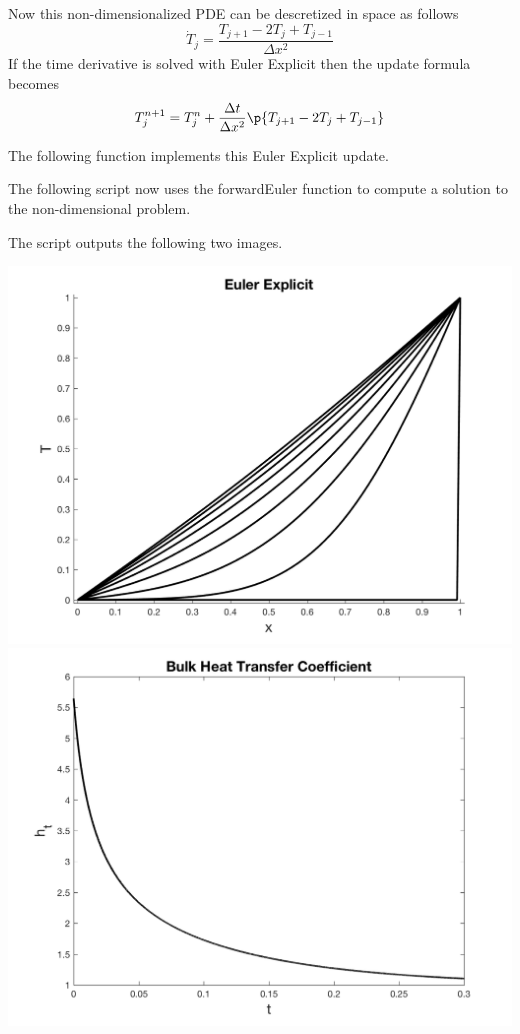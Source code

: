 \documentclass[11pt, oneside]{article}
\begin{document}
\begin{enumerate}
    Now this non-dimensionalized PDE can be descretized in space as follows
    \[
      \dot{T}_j = \frac{T_{j+1} - 2T_j + T_{j-1}}{\Delta x^2}
    \]
    If the time derivative is solved with Euler Explicit then the update formula
    becomes
    \[
      T^{n+1}_j = T^n_{j} + \frac{\Delta t}{\Delta x^2}\p{T_{j+1} - 2T_j + T_{j-1}}
    \]

    The following function implements this Euler Explicit update.
    
    The following script now uses the forwardEuler function to compute a
    solution to the non-dimensional problem.
    
    The script outputs the following two images.
    \begin{center}
      \includegraphics[scale=0.5]{Figures/03_01.png}
      \includegraphics[scale=0.5]{Figures/03_02.png}
    \end{center}


\end{enumerate}
\end{document}
